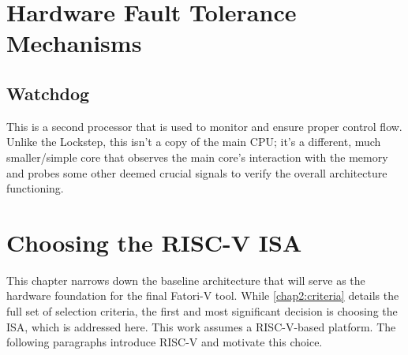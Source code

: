 \cleardoublepage
\label{chap:conclusion}

\section{Hardware Fault Tolerance Mechanisms}
\label{chap2:FTM}



\subsection{Watchdog}
This is a second processor that is used to monitor and ensure proper control flow. Unlike the Lockstep, this isn't a copy of the main CPU; it's a different, much smaller/simple core that observes the main core's interaction with the memory and probes some other deemed crucial signals to verify the overall architecture functioning.





\section{Choosing the RISC-V ISA}
\label{chap2:risc-v}

This chapter narrows down the baseline architecture that will serve as the hardware foundation for the final \ac{Fatori-V} tool. While \cref{chap2:criteria} details the full set of selection criteria, the first and most significant decision is choosing the \ac{ISA}, which is addressed here. This work assumes a \ac{RISC-V}-based platform. The following paragraphs introduce RISC-V and motivate this choice.

